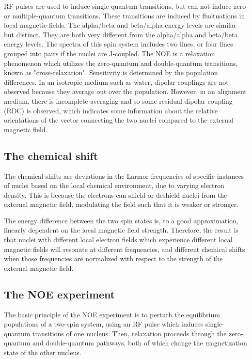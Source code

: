 RF pulses are used to induce single-quantum transitions, but can not induce
zero- or multiple-quantum transitions.  These transitions are induced by 
fluctuations in local magnetic fields.
The alpha/beta and beta/alpha energy levels are similar but distinct.  They are both
very different from the alpha/alpha and beta/beta energy levels.  The spectra of this
spin system includes two lines, or four lines grouped into pairs if the 
nuclei are J-coupled.
The NOE is a relaxation phenomenon which utilizes the zero-quantum and
double-quantum transitions, known as "cross-relaxation".
Sensitivity is determined by the population differences.
In an isotropic medium such as water, dipolar couplings are not observed
because they average out over the population.
However, in an alignment medium, there is incomplete averaging
and so some residual dipolar coupling (RDC) is observed, which indicates 
some information about the relative orientations of the vector connecting
the two nuclei compared to the external magnetic field.


\subsection*{The chemical shift}

The chemical shifts are deviations in the Larmor frequencies of specific 
instances of nuclei based on the local chemical environment, due to varying
electron density.  This is because the electrons can shield or deshield nuclei
from the external magnetic field, modulating the field such that it is weaker
or stronger.

The energy difference between the two spin states is, to a good approximation,
linearly dependent on the local magnetic field strength.  Therefore, the 
result is that nuclei with different local electron fields which experience
different local magnetic fields will resonate at different frequencies, and
different chemical shifts when those frequencies are normalized with respect
to the strength of the external magnetic field.

\subsection*{The NOE experiment}

The basic principle of the NOE experiment is to perturb the equilibrium 
populations of a two-spin system, using an RF pulse which induces single-quantum
transitions of one nucleus.  Then, relaxation proceeds through the zero-quantum
and double-quantum pathways, both of which change the magnetization state of
the other nucleus.

